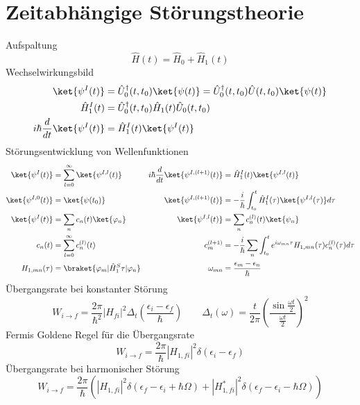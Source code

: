 \section{Zeitabhängige Störungstheorie}

Aufspaltung \cite[Glg. 5.40]{qm}
\begin{equation*}
	\hat{H}(t) = \hat{H}_0 + \hat{H}_1(t)
\end{equation*}
Wechselwirkungsbild \cite[Glg. 5.46, 5.49, 5.48]{qm}
\begin{align*}
		\ket{\psi^I(t)} &= \hat{U}_0^\dagger(t,t_0)\ket{\psi(t)} = \hat{U}_0^\dagger(t,t_0)\hat{U}(t,t_0)\ket{\psi(t)} \\
		\hat{H}_1^I(t) &= \hat{U}_0^\dagger(t,t_0)\hat{H}_1(t)\hat{U}_0(t,t_0) \\
		i\hbar\frac{d}{dt}\ket{\psi^I(t)} &= \hat{H}_1^I(t)\ket{\psi^I(t)}
\end{align*}
Störungsentwicklung von Wellenfunktionen \cite[Glg. 5.52, 5.53, 5.54, 5.57, 5.58, 5.59, 5.62, 5.62]{qm}
\begin{align*}
	\ket{\psi^I(t)} &= \sum_{l=0}^\infty\ket{\psi^{I,l}(t)} & i\hbar\frac{d}{dt}\ket{\psi^{I,(l+1)}(t)} &= \hat{H}_1^I(t)\ket{\psi^{I,l}(t)} \\
	\ket{\psi^{I,0}(t)} &= \ket{\psi(t_0)} & \ket{\psi^{I,(l+1)}(t)} &= -\frac{i}{\hbar}\int_{t_0}^t\hat{H}_1^I(\tau)\ket{\psi^{I,l}(\tau)}d\tau \\
	\ket{\psi^I(t)} &= \sum_nc_n(t)\ket{\varphi_n} & \ket{\psi^{I,l}(t)} &= \sum_nc_n^{(l)}(t)\ket{\psi_n} \\
	c_n(t) &= \sum_{l=0}^\infty c_n^{(l)}(t) & c_m^{(l+1)} &= -\frac{i}{\hbar}\sum_n\int_{t_0}^te^{i\omega_{mn}\tau}H_{1,mn}(\tau)c_n^{(l)}(\tau)d\tau \\
	H_{1,mn}(\tau) &= \braket{\varphi_m|\hat{H}_1^S{\tau}|\varphi_n} & \omega_{mn} &= \frac{\epsilon_m-\epsilon_n}{\hbar}
\end{align*}
Übergangsrate bei konstanter Störung \cite[Glg. 5.78]{qm}
\begin{equation*}
	W_{i\to f}=\frac{2\pi}{\hbar^2}|H_{fi}|^2\Delta_t\left(\frac{\epsilon_i-\epsilon_f}{\hbar}\right) \qquad \Delta_t(\omega)=\frac{t}{2\pi}\left(\frac{\sin\frac{\omega t}{2}}{\frac{\omega t}{2}}\right)^2
\end{equation*}
Fermis Goldene Regel für die Übergangsrate \cite[Glg. 5.81]{qm}
\begin{equation*}
	W_{i\to f} = \frac{2\pi}{\hbar}|H_{1,fi}|^2\delta(\epsilon_i-\epsilon_f)
\end{equation*}
Übergangsrate bei harmonischer Störung \cite[Glg. 5.88]{qm}
\begin{equation*}
    W_{i\to f} = \frac{2\pi}{\hbar}\left(|H_{1,fi}|^2\delta(\epsilon_f-\epsilon_i+\hbar\Omega)+|H^*_{1,fi}|^2\delta(\epsilon_f-\epsilon_i-\hbar\Omega)\right)
\end{equation*}
